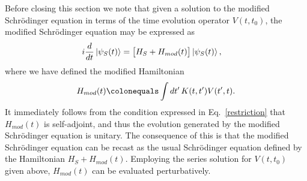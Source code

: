 \documentclass[a4paper,twocolumn,superscriptaddress,11pt,accepted=2019-06-04]{quantumarticle}
\newcommand{\ce}{\colonequals}
\newcommand{\nn}{\nonumber}		%
\begin{document}
{{Before closing this section we note that given a solution to the modified Schr\"{o}dinger equation in terms of the time evolution operator $V(t,t_0)$, the modified Schr\"{o}dinger equation may be expressed as
\begin{align}
i \frac{d}{dt} \ket{\psi_S(t)} &= \big[ H_S + H_{mod}(t) \big] \ket{\psi_S(t)}, \nn
\end{align}
where we have defined the modified Hamiltonian 
\begin{align}
H_{mod}(t) \ce \int dt' \, K(t,t') V(t',t). \nn
\end{align}
It immediately follows from the condition expressed in Eq.~\eqref{restriction} that $H_{mod}(t)$ is self-adjoint, and thus the evolution generated by the modified Schr\"{o}dinger equation is unitary. The consequence of this is that the modified Schr\"{o}dinger equation can be recast as the usual Schr\"{o}dinger equation defined by the Hamiltonian \mbox{$H_S + H_{mod}(t)$}. Employing the series solution for $V(t,t_0)$ given above,  $H_{mod}(t)$ can be evaluated perturbatively.}



}
\end{document}
